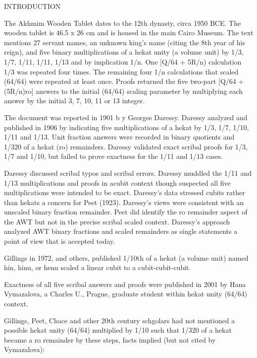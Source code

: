 \documentclass[12pt]{article}
\begin{document}

INTRODUCTION

The Akhmim Wooden Tablet dates to the 12th dynasty, circa 1950 BCE. The wooden tablet is 46.5 x 26 cm and is housed in the main Cairo Museum. The text mentions 27 servant names, an unknown king's name (citing the 8th year of his reign), and five binary multiplications of a hekat unity (a volume unit) by 1/3, 1/7, 1/11, 1/11, 1/13 and by implication 1/n.  One [Q/64 + 5R/n) calculation 1/3 was repeated four times. The remaining four 1/n calculations that scaled (64/64) were repeated at least once. Proofs returned the five two-part [Q/64 + (5R/n)ro] answers to the initial (64/64) scaling parameter by multiplying each answer by the initial 3, 7, 10, 11 or 13 integer.

The document was reported in 1901 b y Georges Daressy. Daressy analyzed and published in 1906 by indicating five multiplications of a hekat by 1/3, 1/7, 1/10, 1/11 and 1/13. Unit fraction answers were recorded in binary quotients and 1/320 of a hekat (ro) remainders. Daressy validated exact scribal proofs for 1/3, 1/7 and 1/10, but failed to prove exactness for the 1/11 and 1/13 cases.  

Daressy discussed scribal typos and scribal errors. Daressy muddled the 1/11 and 1/13 multiplications and proofs in acubit context though suspected all five multiplications were intended to be exact.  Daressy's data stressed cubits rather than hekats a concern for Peet (1923). Daressy's views were consistent with an unscaled binary fraction remainder. Peet did identify the ro remainder aspect of the AWT but not in the precise scribal scaled context. Daressy's approach analyzed AWT binary fractions and scaled remainders as single statements a point of view that is accepted today.

Gillings in 1972, and others, published 1/10th of a hekat (a volume unit) named hin, hinu, or henu scaled a linear cubit to a cubit-cubit-cubit. 

Exactness of all five scribal answers and proofs were published in 2001 by Hana Vymazalova, a Charles U., Prague, graduate student within hekat unity (64/64) context.

Gillings, Peet, Chace and other 20th century schgolars had not mentioned a possible hekat unity (64/64) multiplied by 1/10 such that 1/320 of a hekat became a ro remainder by these steps, facts implied (but not cited by Vymazalova):
\end{document}
